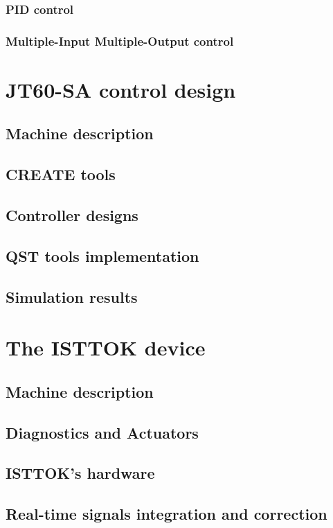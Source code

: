 \documentclass{article}
\begin{document}
\subsubsection{PID control}
\subsubsection{Multiple-Input Multiple-Output control}
 
\hfil
\section{JT60-SA control design}
\subsection{Machine description}
\subsection{CREATE tools}
\subsection{Controller designs}
\subsection{QST tools implementation}
\subsection{Simulation results}
\hfil
\section{The ISTTOK device}
\subsection{Machine description}
\subsection{Diagnostics and Actuators}
\subsection{ISTTOK's hardware}
\subsection{Real-time signals integration and correction}
\end{document}
